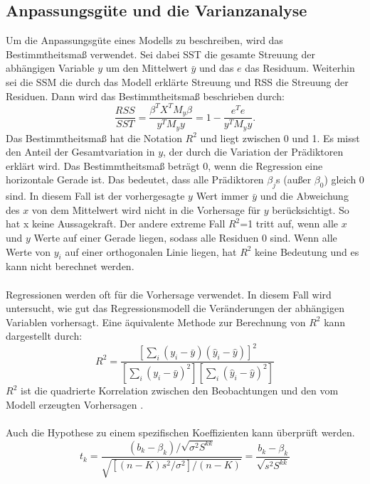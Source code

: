 \subsection{Anpassungsgüte und die Varianzanalyse}
\label{AnpassungsgüteUndDieVarianzanalyse}
Um die Anpassungsgüte eines Modells zu beschreiben, wird das Bestimmtheitsmaß verwendet. Sei dabei \ac{SST} die gesamte Streuung der abhängigen Variable \( y \) um den Mittelwert \( \bar{y} \) und das \(e\) das Residuum. Weiterhin sei die \ac{SSM} die durch das Modell erklärte Streuung und \ac{RSS} die Streuung der Residuen. Dann wird das Bestimmtheitsmaß beschrieben durch: 
\begin{equation}
\frac{RSS}{SST} = \frac{\beta^{T}X^{T}M_{y}\beta}{y^{T}M_{y}y} = 1 - \frac{e^{T}e}{y^{T}M_{y}y}.
\label{R2kurz}
\end{equation}
Das Bestimmtheitsmaß hat die Notation  \( R^2 \) und liegt zwischen 0 und 1. Es misst den Anteil der Gesamtvariation in \(y\), der durch die Variation der Prädiktoren erklärt wird. Das Bestimmtheitsmaß beträgt 0, wenn die Regression eine horizontale Gerade ist. Das bedeutet, dass alle Prädiktoren $\beta_j$s (außer $\beta_0$) gleich 0 sind. In diesem Fall ist der vorhergesagte $y$ Wert immer $\bar{y}$ und die Abweichung des $x$ von dem Mittelwert wird nicht in die Vorhersage für $y$ berücksichtigt. So hat x keine Aussagekraft. Der andere extreme Fall \(R^2\)=1 tritt auf, wenn alle \(x\) und \(y\) Werte auf einer Gerade liegen, sodass alle Residuen 0 sind. Wenn alle Werte von $y_i$ auf einer orthogonalen Linie liegen, hat $R^2$ keine Bedeutung und es kann nicht berechnet werden.  \\\\ 
Regressionen werden oft für die Vorhersage verwendet. 
In diesem Fall wird untersucht, wie gut das Regressionsmodell die Veränderungen der abhängigen Variablen vorhersagt. Eine äquivalente Methode zur Berechnung von $R^2$ kann dargestellt durch: 
\begin{equation}
R^2 = \frac{\left[\sum_{i}(y_i - \bar{y})(\hat{y}_i - \hat{y})\right]^2}{\left[\sum_{i}(y_i - \bar{y})^2\right]\left[\sum_{i}(\hat{y}_i - \hat{y})^2\right]}
\label{R2Formel}
\end{equation}
$R^2$ ist die quadrierte Korrelation zwischen den Beobachtungen und den vom Modell erzeugten Vorhersagen \cite{greene2003econometric}.\\\\
Auch die Hypothese zu einem spezifischen Koeffizienten kann überprüft werden.  
\begin{equation}
t_k = \frac{(b_k - \beta_k)/\sqrt{\sigma^2 S^{kk}}}{\sqrt{[(n-K)s^2/\sigma^2]/(n-K)}} = \frac{b_k - \beta_k}{\sqrt{s^2 S^{kk}}}
\label{eq:tk_formula}
\end{equation}
